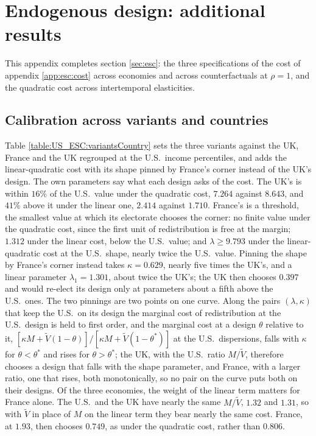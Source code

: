 \FloatBarrier
\section{Endogenous design: additional results}\label{app:escDetails}\setcounter{equation}{0}
This appendix completes section \ref{sec:esc}: the three specifications of the cost of appendix \ref{app:esc:cost} across economies and across counterfactuals at $\rho = 1$, and the quadratic cost across intertemporal elasticities.

\subsection{Calibration across variants and countries}\label{app:escDetails:calibration}
Table \ref{table:US_ESC:variantsCountry} sets the three variants against the UK, France and the UK regrouped at the U.S.\ income percentiles, and adds the linear-quadratic cost with its shape pinned by France's corner instead of the UK's design. The own parameters say what each design asks of the cost. The UK's is within $16\%$ of the U.S.\ value under the quadratic cost, $7.264$ against $8.643$, and $41\%$ above it under the linear one, $2.414$ against $1.710$. France's is a threshold, the smallest value at which its electorate chooses the corner: no finite value under the quadratic cost, since the first unit of redistribution is free at the margin; $1.312$ under the linear cost, below the U.S.\ value; and $\lambda \geq 9.793$ under the linear-quadratic cost at the U.S.\ shape, nearly twice the U.S.\ value. Pinning the shape by France's corner instead takes $\kappa = 0.629$, nearly five times the UK's, and a linear parameter $\lambda_1 = 1.301$, about twice the UK's; the UK then chooses $0.397$ and would re-elect its design only at parameters about a fifth above the U.S.\ ones. The two pinnings are two points on one curve. Along the pairs $(\lambda,\kappa)$ that keep the U.S.\ on its design the marginal cost of redistribution at the U.S.\ design is held to first order, and the marginal cost at a design $\theta$ relative to it, $[\kappa M + \tilde{V}(1-\theta)]/[\kappa M + \tilde{V}(1-\theta^{\ast})]$ at the U.S.\ dispersions, falls with $\kappa$ for $\theta < \theta^{\ast}$ and rises for $\theta > \theta^{\ast}$; the UK, with the U.S.\ ratio $M/\tilde{V}$, therefore chooses a design that falls with the shape parameter, and France, with a larger ratio, one that rises, both monotonically, so no pair on the curve puts both on their designs. Of the three economies, the weight of the linear term matters for France alone. The U.S.\ and the UK have nearly the same $M/\tilde{V}$, $1.32$ and $1.31$, so with $\tilde{V}$ in place of $M$ on the linear term they bear nearly the same cost. France, at $1.93$, then chooses $0.749$, as under the quadratic cost, rather than $0.806$.

